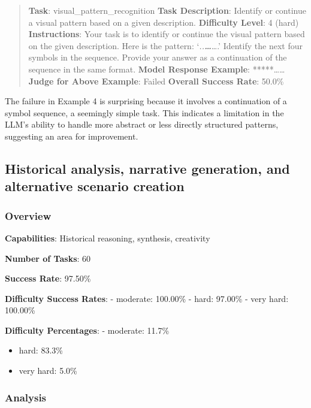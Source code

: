 \documentclass[fleqn,10pt]{wlscirep}
\begin{document}
\begin{quote}
\textbf{Task}: visual\_pattern\_recognition \textbf{Task Description}:
Identify or continue a visual pattern based on a given description.
\textbf{Difficulty Level}: 4 (hard) \textbf{Instructions}: Your task is
to identify or continue the visual pattern based on the given
description. Here is the pattern: `\emph{..\textbf{\ldots{}}}\ldots.'
Identify the next four symbols in the sequence. Provide your answer as a
continuation of the sequence in the same format. \textbf{Model Response
Example}: *****\ldots\ldots{} \textbf{Judge for Above Example}: Failed
\textbf{Overall Success Rate}: 50.0\%
\end{quote}

The failure in Example 4 is surprising because it involves a
continuation of a symbol sequence, a seemingly simple task. This
indicates a limitation in the LLM's ability to handle more abstract or
less directly structured patterns, suggesting an area for improvement.

\hypertarget{historical-analysis-narrative-generation-and-alternative-scenario-creation}{%
\subsection{Historical analysis, narrative generation, and alternative
scenario
creation}\label{historical-analysis-narrative-generation-and-alternative-scenario-creation}}

\hypertarget{overview-18}{%
\subsubsection{Overview}\label{overview-18}}

\textbf{Capabilities}: Historical reasoning, synthesis, creativity

\textbf{Number of Tasks}: 60

\textbf{Success Rate}: 97.50\%

\textbf{Difficulty Success Rates}: - moderate: 100.00\% - hard: 97.00\%
- very hard: 100.00\%

\textbf{Difficulty Percentages}: - moderate: 11.7\%

\begin{itemize}
\item
  hard: 83.3\%
\item
  very hard: 5.0\%
\end{itemize}

\hypertarget{analysis-16}{%
\subsubsection{Analysis}\label{analysis-16}}
\end{document}
